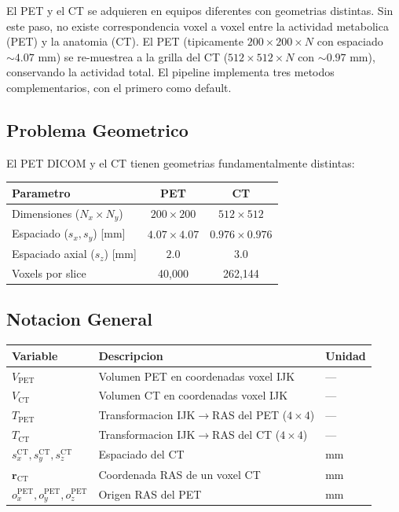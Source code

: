 \documentclass[12pt,a4paper]{article}
\begin{document}
El PET y el CT se adquieren en equipos diferentes con geometrias distintas. Sin este paso, no
existe correspondencia voxel a voxel entre la actividad metabolica (PET) y la anatomia (CT).
El PET (tipicamente $200\times200\times N$ con espaciado $\sim 4.07$ mm) se re-muestrea a la
grilla del CT ($512\times512\times N$ con $\sim 0.97$ mm), conservando la actividad total.
El pipeline implementa tres metodos complementarios, con el primero como default.

\subsection{Problema Geometrico}

El PET DICOM y el CT tienen geometrias fundamentalmente distintas:

\begin{table}[H]
\centering
\begin{tabular}{l c c}
\toprule
\textbf{Parametro} & \textbf{PET} & \textbf{CT} \\
\midrule
Dimensiones ($N_x \times N_y$) & $200 \times 200$ & $512 \times 512$ \\
Espaciado ($s_x, s_y$) [mm] & $4.07 \times 4.07$ & $0.976 \times 0.976$ \\
Espaciado axial ($s_z$) [mm] & $2.0$ & $3.0$ \\
Voxels por slice & 40,000 & 262,144 \\
\bottomrule
\end{tabular}
\end{table}

\subsection{Notacion General}

\begin{table}[H]
\centering
\begin{tabular}{lll}
\toprule
\textbf{Variable} & \textbf{Descripcion} & \textbf{Unidad} \\
\midrule
$V_{\text{PET}}$ & Volumen PET en coordenadas voxel IJK & --- \\
$V_{\text{CT}}$ & Volumen CT en coordenadas voxel IJK & --- \\
$T_{\text{PET}}$ & Transformacion IJK$\to$RAS del PET ($4\times4$) & --- \\
$T_{\text{CT}}$ & Transformacion IJK$\to$RAS del CT ($4\times4$) & --- \\
$s_x^{\text{CT}}, s_y^{\text{CT}}, s_z^{\text{CT}}$ & Espaciado del CT & mm \\
$\mathbf{r}_{\text{CT}}$ & Coordenada RAS de un voxel CT & mm \\
$o_x^{\text{PET}}, o_y^{\text{PET}}, o_z^{\text{PET}}$ & Origen RAS del PET & mm \\
\bottomrule
\end{tabular}
\end{table}
\end{document}
